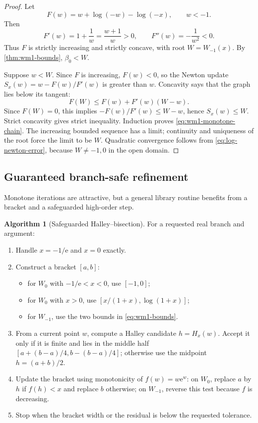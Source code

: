 \documentclass[11pt]{article}
\numberwithin{equation}{section}
\theoremstyle{definition}
\newtheorem{algorithm}[theorem]{Algorithm}
\theoremstyle{remark}
\newcommand{\e}{\mathrm e}
\begin{document}
\begin{proof}
Let
\[
 F(w)=w+\log(-w)-\log(-x),\qquad w<-1.
\]
Then
\[
 F'(w)=1+\frac1w=\frac{w+1}{w}>0,
 \qquad
 F''(w)=-\frac1{w^2}<0.
\]
Thus $F$ is strictly increasing and strictly concave, with root
$W=W_{-1}(x)$.  By \cref{thm:wm1-bounds}, $\beta_0<W$.

Suppose $w<W$.  Since $F$ is increasing, $F(w)<0$, so the Newton update
$S_x(w)=w-F(w)/F'(w)$ is greater than $w$.  Concavity says that the graph lies
below its tangent:
\[
 F(W)\le F(w)+F'(w)(W-w).
\]
Since $F(W)=0$, this implies
$-F(w)/F'(w)\le W-w$, hence $S_x(w)\le W$.  Strict concavity gives strict
inequality.  Induction proves \eqref{eq:wm1-monotone-chain}.  The increasing
bounded sequence has a limit; continuity and uniqueness of the root force the
limit to be $W$.  Quadratic convergence follows from
\eqref{eq:log-newton-error}, because $W\ne-1,0$ in the open domain.
\end{proof}

\subsection{Guaranteed branch-safe refinement}

Monotone iterations are attractive, but a general library routine benefits
from a bracket and a safeguarded high-order step.

\begin{algorithm}[Safeguarded Halley--bisection]
\label{alg:safeguarded}
For a requested real branch and argument:
\begin{enumerate}
\item Handle $x=-1/\e$ and $x=0$ exactly.
\item Construct a bracket $[a,b]$:
  \begin{itemize}
  \item for $W_0$ with $-1/\e<x<0$, use $[-1,0]$;
  \item for $W_0$ with $x>0$, use
        $[x/(1+x),\log(1+x)]$;
  \item for $W_{-1}$, use the two bounds in
        \eqref{eq:wm1-bounds}.
  \end{itemize}
\item From a current point $w$, compute a Halley candidate $h=H_x(w)$.
Accept it only if it is finite and lies in the middle half
$[a+(b-a)/4,b-(b-a)/4]$; otherwise use the midpoint $h=(a+b)/2$.
\item Update the bracket using monotonicity of $f(w)=w\e^w$:
  on $W_0$, replace $a$ by $h$ if $f(h)<x$ and replace $b$ otherwise;
  on $W_{-1}$, reverse this test because $f$ is decreasing.
\item Stop when the bracket width or the residual is below the requested
      tolerance.
\end{enumerate}
\end{algorithm}
\end{document}
